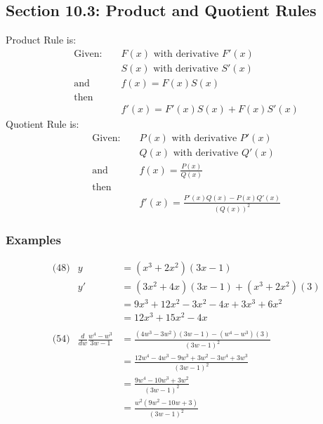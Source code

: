 \documentclass[14pt]{extarticle}
\begin{document}
\cleardoublepage
\subsection{Section 10.3: Product and Quotient Rules}
Product Rule is:
\begin{align*}
	&\text{Given: } & &F(x) \text{ with derivative } F'(x) \\
	& & &S(x) \text{ with derivative } S'(x) \\
	&\text{and } & &f(x) = F(x)S(x) \\
	&\text{then }\\
	& & &f'(x) = F'(x)S(x) + F(x)S'(x)
\end{align*}
Quotient Rule is:
\begin{align*}
	&\text{Given: } & &P(x) \text{ with derivative } P'(x) \\
	& & &Q(x) \text{ with derivative } Q'(x) \\
	&\text{and } & &f(x) = \frac{P(x)}{Q(x)} \\
	&\text{then }\\
	& & &f'(x) = \frac{P'(x)Q(x) - P(x)Q'(x)}{(Q(x))^2}
\end{align*}

\subsubsection*{Examples}
\begin{align*}
	&\text{(48)} &y &= (x^3 + 2x^2)(3x-1) \\
	&			&y' &= (3x^2 + 4x)(3x -1) + (x^3 + 2x^2)(3) \\
	&			&    &= 9x^3 + 12x^2 - 3x^2 -4x + 3x^3 +6x^2 \\
	&			&    &= 12x^3 + 15x^2 - 4x\\\\
	&\text{(54)} &\frac{d}{dw} \frac{w^4 - w^3}{3w-1}&= \frac{(4w^3 - 3w^2)(3w-1) - (w^4 - w^3)(3)}{(3w-1)^2} \\
	&	&		&= \frac{12w^4- 4w^3 - 9w^3 + 3w^2 - 3w^4 + 3w^3}{(3w-1)^2} \\
	&	&		&=\frac{9w^4- 10w^3 + 3w^2 }{(3w-1)^2} \\
	&	&		&=\frac{w^2(9w^2- 10w + 3) }{(3w-1)^2} \\
\end{align*}



\cleardoublepage
\end{document}
